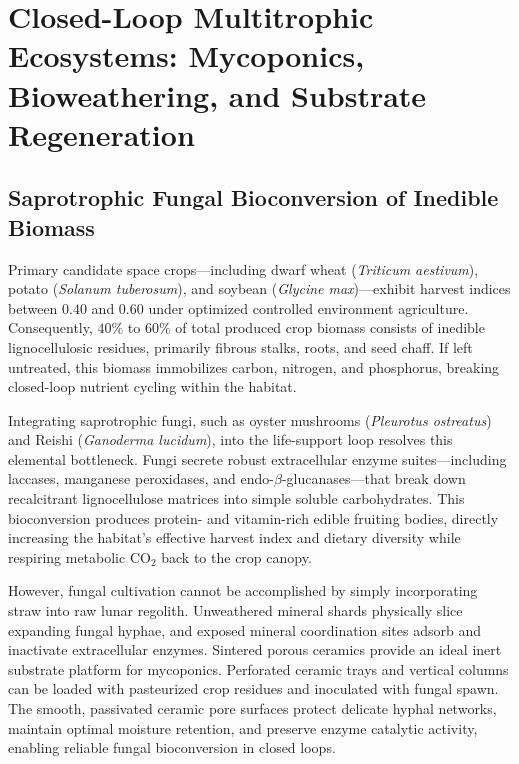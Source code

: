 \section{Closed-Loop Multitrophic Ecosystems: Mycoponics, Bioweathering, and Substrate Regeneration}
\label{sec:closed_loop}

\subsection{Saprotrophic Fungal Bioconversion of Inedible Biomass}
\label{subsec:mycoponics}

Primary candidate space crops---including dwarf wheat (\textit{Triticum aestivum}), potato (\textit{Solanum tuberosum}), and soybean (\textit{Glycine max})---exhibit harvest indices between $0.40$ and $0.60$ under optimized controlled environment agriculture\cite{wheeler2017agriculture,ming1989lunar,wheeler2006potato}. Consequently, $40\%$ to $60\%$ of total produced crop biomass consists of inedible lignocellulosic residues, primarily fibrous stalks, roots, and seed chaff\cite{ming1989lunar,wheeler2006potato,gitelson1995biological}. If left untreated, this biomass immobilizes carbon, nitrogen, and phosphorus, breaking closed-loop nutrient cycling within the habitat\cite{wheeler2017agriculture,ming1989lunar,grimm2018mushroom,verseux2022editorial}.

Integrating saprotrophic fungi, such as oyster mushrooms (\textit{Pleurotus ostreatus}) and Reishi (\textit{Ganoderma lucidum}), into the life-support loop resolves this elemental bottleneck\cite{ming1989lunar,grimm2018mushroom,verseux2022editorial,eaglin2026clinostat}. Fungi secrete robust extracellular enzyme suites---including laccases, manganese peroxidases, and endo-$\beta$-glucanases---that break down recalcitrant lignocellulose matrices into simple soluble carbohydrates\cite{ming1989lunar,liao2025simulated}. This bioconversion produces protein- and vitamin-rich edible fruiting bodies, directly increasing the habitat's effective harvest index and dietary diversity while respiring metabolic $\mathrm{CO}_2$ back to the crop canopy\cite{ming1989lunar,grimm2018mushroom,verseux2022editorial}.

However, fungal cultivation cannot be accomplished by simply incorporating straw into raw lunar regolith\cite{ming1989lunar,eaglin2026clinostat}. Unweathered mineral shards physically slice expanding fungal hyphae, and exposed mineral coordination sites adsorb and inactivate extracellular enzymes\cite{turci2015mechanistic,fackrell2024mechanical}. Sintered porous ceramics provide an ideal inert substrate platform for mycoponics\cite{ming1989lunar}. Perforated ceramic trays and vertical columns can be loaded with pasteurized crop residues and inoculated with fungal spawn\cite{ming1989lunar}. The smooth, passivated ceramic pore surfaces protect delicate hyphal networks, maintain optimal moisture retention, and preserve enzyme catalytic activity, enabling reliable fungal bioconversion in closed loops\cite{ming1989lunar,eaglin2026clinostat}.

